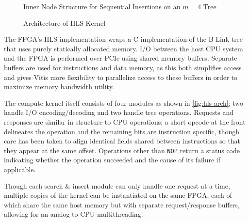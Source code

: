 \begin{figure}
	\centering
	
	\caption{Inner Node Structure for Sequential Insertions on an $m=4$ Tree}
	\label{fig:sequential-imbalance}
\end{figure}


\label{subsec:fpga-implementation}

\begin{figure}
	\centering
	
	\caption{Architecture of HLS Kernel}
	\label{fig:hls-arch}
\end{figure}

The FPGA's HLS implementation wraps a C implementation of the B-Link tree that
uses purely statically allocated memory. I/O between the host CPU system and the
FPGA is performed over PCIe using shared memory buffers. Separate buffers are
used for instructions and data memory, as this both simplifies access and gives
Vitis more flexibility to parallelize access to these buffers in order to
maximize memory bandwidth utility.

The compute kernel itself consists of four modules as shown in
\autoref{fig:hls-arch}; two handle I/O encoding/decoding and two handle tree
operations. Requests and responses are similar in structure to CPU operations; a
short opcode at the front delineates the operation and the remaining bits are
instruction specific, though care has been taken to align identical fields
shared between instructions so that they appear at the same offset. Operations
other than \texttt{NOP} return a status code indicating whether the operation
succeeded and the cause of its failure if applicable.

Though each search \& insert module can only handle one request at a time,
multiple copies of the kernel can be instantiated on the same FPGA, each of
which share the same host memory but with separate request/response buffers,
allowing for an analog to CPU multithreading.
